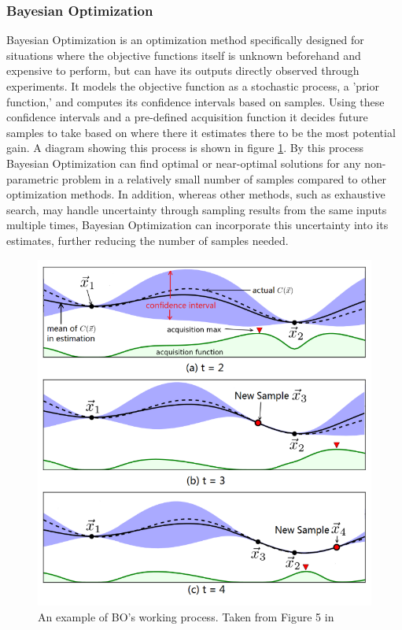 \documentclass{report}
\begin{document}
\subsubsection{Bayesian Optimization}
Bayesian Optimization is an optimization method specifically designed for situations where the objective functions itself is unknown beforehand and expensive to perform, but can have its outputs directly observed through experiments\cite{Snoek2012}. It models the objective function as a stochastic process, a 'prior function,' and computes its confidence intervals based on samples. Using these confidence intervals and a pre-defined acquisition function it decides future samples to take based on where there it estimates there to be the most potential gain. A diagram showing this process is shown in figure \ref{fig:cherrypic}. By this process Bayesian Optimization can find optimal or near-optimal solutions for any non-parametric problem in a relatively small number of samples compared to other optimization methods. In addition, whereas other methods, such as exhaustive search, may handle uncertainty through sampling results from the same inputs multiple times, Bayesian Optimization can incorporate this uncertainty into its estimates, further reducing the number of samples needed.

\begin{figure}[!hb]
  \centering
   \includegraphics[scale=0.5]{Cherrypic}
  \caption{An example of BO's working process. Taken from Figure 5 in \cite{Alipourfard2017}}
  \label{fig:cherrypic}
\end{figure}
\end{document}
